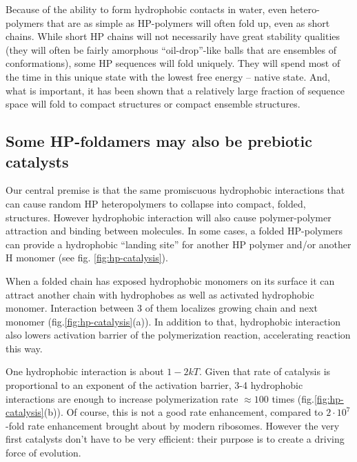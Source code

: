 \documentclass[journal=jacsat,manuscript=article,layout=twocolumn]{achemso}
\begin{document}
Because of the ability to form hydrophobic contacts in water, even hetero-polymers that 
are as simple as HP-polymers will often fold up, even as short chains. 
While short HP chains will not necessarily have great stability qualities (they will often be 
fairly amorphous ``oil-drop''-like balls that are ensembles of conformations), some HP 
sequences will fold uniquely. They will spend most of the time in this unique state with the 
lowest free energy -- native state. And, what is important, it has been shown that a 
relatively large fraction of sequence space will fold to compact structures or compact ensemble 
structures\cite{lau1989lattice}.

\subsection{Some HP-foldamers may also be prebiotic catalysts}
Our central premise is that the same promiscuous hydrophobic interactions that can cause random 
HP heteropolymers to collapse into compact, folded, structures. However hydrophobic 
interaction will also cause polymer-polymer attraction and binding between molecules.  In some 
cases, a folded HP-polymers can provide a hydrophobic ``landing site'' for another HP polymer 
and/or another H monomer (see fig. \ref{fig:hp-catalysis}).  


When a folded chain has exposed hydrophobic monomers on its surface it can attract another chain 
with hydrophobes as well as activated hydrophobic monomer. Interaction between 3 of them localizes 
growing chain and next monomer (fig.\ref{fig:hp-catalysis}(a)). In addition to that, hydrophobic 
interaction also lowers activation barrier of the polymerization reaction, accelerating reaction 
this way.

One hydrophobic interaction is about $1-2kT$. Given that rate of catalysis is proportional to an 
exponent of the activation barrier, 3-4 hydrophobic interactions are enough to increase 
polymerization rate $\approx 100$ times (fig.\ref{fig:hp-catalysis}(b)). 
Of course, this is not a good rate enhancement, compared to $2\cdot10^7$-fold rate enhancement 
brought about
by modern ribosomes\cite{Sievers2004a}. However the very 
first catalysts don't have to be very efficient: their purpose is to create a driving force of 
evolution.
\end{document}
